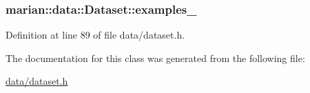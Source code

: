 \subsubsection[{\texorpdfstring{examples\+\_\+}{examples_}}]{ marian\+::data\+::\+Dataset\+::examples\+\_\+\hspace{0.3cm}{\ttfamily [protected]}}\hypertarget{classmarian_1_1data_1_1Dataset_a6d4b73b53b23369c49225d3d913a499a}{}\label{classmarian_1_1data_1_1Dataset_a6d4b73b53b23369c49225d3d913a499a}


Definition at line 89 of file data/dataset.\+h.



The documentation for this class was generated from the following file\+:\begin{DoxyCompactItemize}
\item 
\hyperlink{data_2dataset_8h}{data/dataset.\+h}\end{DoxyCompactItemize}
